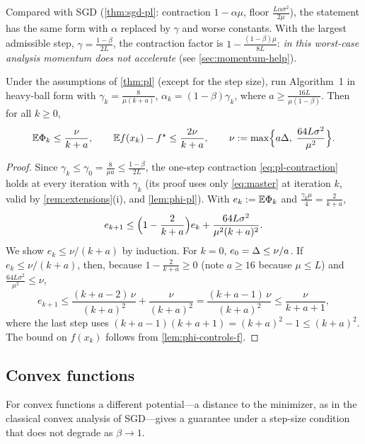 Compared with SGD (\cref{thm:sgd-pl}: contraction $1-\alpha\mu$, floor
$\frac{L\alpha\sigma^2}{2\mu}$), the statement has the same form with $\alpha$ replaced by
$\gamma$ and worse constants. With the largest admissible step,
$\gamma=\frac{1-\beta}{2L}$, the contraction factor is $1-\frac{(1-\beta)\mu}{8L}$: \emph{in
this worst-case analysis momentum does not accelerate} (see \cref{sec:momentum-help}).

\begin{corollary}\label{cor:pl-decay}
Under the assumptions of \cref{thm:pl} (except for the step size), run Algorithm~1 in
heavy-ball form with $\gamma_k=\frac{8}{\mu(k+a)}$, $\alpha_k=(1-\beta)\gamma_k$, where
$a\ge\frac{16L}{\mu(1-\beta)}$. Then for all $k\ge0$,
\[
  \mathbb{E}\Phi_k\le\frac{\nu}{k+a},\qquad\mathbb{E} f(x_k)-f^\star\le\frac{2\nu}{k+a},\qquad
  \nu:=\max\Bigl\{a\Delta,\;\frac{64L\sigma^2}{\mu^2}\Bigr\}.
\]
\end{corollary}

\begin{proof}
Since $\gamma_k\le\gamma_0=\frac{8}{\mu a}\le\frac{1-\beta}{2L}$, the one-step contraction
\eqref{eq:pl-contraction} holds at every iteration with $\gamma_k$ (its proof uses only
\eqref{eq:master} at iteration $k$, valid by \cref{rem:extensions}(i), and
\cref{lem:phi-pl}). With $e_k:=\mathbb{E}\Phi_k$ and $\frac{\gamma_k\mu}{4}=\frac2{k+a}$,
\[
  e_{k+1}\le\Bigl(1-\frac{2}{k+a}\Bigr)e_k+\frac{64L\sigma^2}{\mu^2(k+a)^2}.
\]
We show $e_k\le\nu/(k+a)$ by induction. For $k=0$, $e_0=\Delta\le\nu/a$. If
$e_k\le\nu/(k+a)$, then, because $1-\frac2{k+a}\ge0$ (note $a\ge16$ because $\mu\le L$) and
$\frac{64L\sigma^2}{\mu^2}\le\nu$,
\[
  e_{k+1}\le\frac{(k+a-2)\,\nu}{(k+a)^2}+\frac{\nu}{(k+a)^2}=\frac{(k+a-1)\,\nu}{(k+a)^2}\le\frac{\nu}{k+a+1},
\]
where the last step uses $(k+a-1)(k+a+1)=(k+a)^2-1\le(k+a)^2$. The bound on $f(x_k)$ follows
from \cref{lem:phi-controls-f}.
\end{proof}

\subsection{Convex functions}

For convex functions a different potential---a distance to the minimizer, as in the
classical convex analysis of SGD---gives a guarantee under a step-size condition that
does not degrade as $\beta\to1$.

